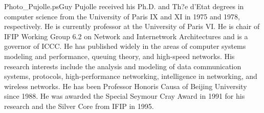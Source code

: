 \documentclass[10pt,twocolumn,twoside,submit]{JCNtran}
\begin{document}
\newpage

\epsfysize=3.2cm
\begin{biography}{Photo_Pujolle.ps}{Guy Pujolle} received his
Ph.D. and Th?e d'Etat degrees in computer science from the
University of Paris IX and XI in 1975 and 1978, respectively. He
is currently professor at the University of Paris VI. He is chair
of IFIP Working Group 6.2 on Network and Internetwork
Architectures and is a governor of ICCC. He has published widely
in the areas of computer systems modeling and performance, queuing
theory, and high-speed networks. His research interests include
the analysis and modeling of data communication systems,
protocols, high-performance networking, intelligence in
networking, and wireless networks. He has been Professor Honoris
Causa of Beijing University since 1988. He was awarded the Special
Seymour Cray Award in 1991 for his research and the Silver Core
from IFIP in 1995.
\end{biography}
\end{document}
